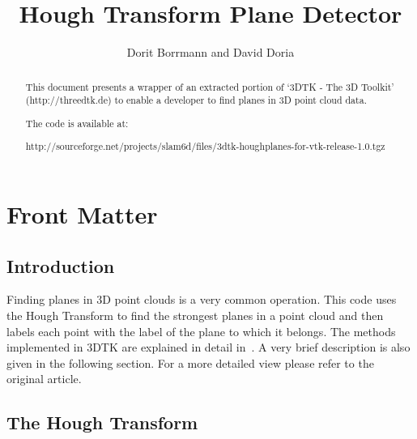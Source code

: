 \documentclass{InsightArticle}
\title{Hough Transform Plane Detector}
\author{Dorit Borrmann and David Doria}
\newcommand{\IJhandlerIDnumber}{3250}
\begin{document}
\IJhandlefooter{\IJhandlerIDnumber}


\ifpdf
\else
\fi


\maketitle


\ifhtml
\chapter*{Front Matter\label{front}}
\fi

\begin{abstract}
\noindent
This document presents a wrapper of an extracted portion of `3DTK - The 3D Toolkit' (http://threedtk.de) to enable a developer to find planes in 3D point cloud data.

\vspace{14pt}

\noindent The code is available at:

\noindent http://sourceforge.net/projects/slam6d/files/3dtk-houghplanes-for-vtk-release-1.0.tgz

\end{abstract}

\IJhandlenote{\IJhandlerIDnumber}

\tableofcontents
\section{Introduction}
Finding planes in 3D point clouds is a very common operation. This code uses the
Hough Transform to find the strongest planes in a point cloud and then labels
each point with the label of the plane to which it belongs. The methods
implemented in 3DTK are explained in detail in~\cite{Borrmann:2011}. A very
brief description is also given in the following section. For a more detailed view please refer to
the original article.

\section{The Hough Transform}
\end{document}
